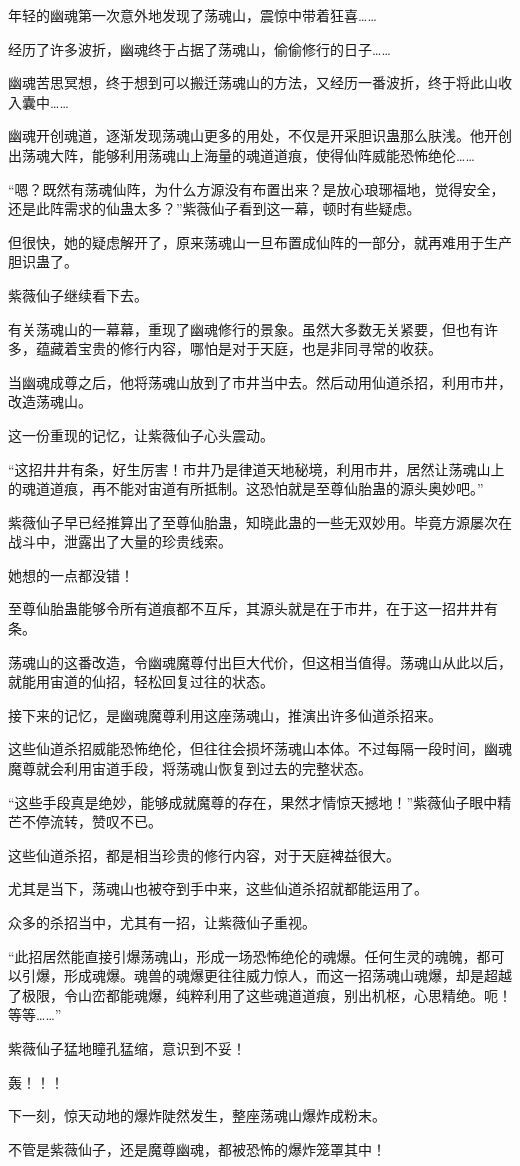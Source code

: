\begin{this_body}
年轻的幽魂第一次意外地发现了荡魂山，震惊中带着狂喜……

经历了许多波折，幽魂终于占据了荡魂山，偷偷修行的日子……

幽魂苦思冥想，终于想到可以搬迁荡魂山的方法，又经历一番波折，终于将此山收入囊中……

幽魂开创魂道，逐渐发现荡魂山更多的用处，不仅是开采胆识蛊那么肤浅。他开创出荡魂大阵，能够利用荡魂山上海量的魂道道痕，使得仙阵威能恐怖绝伦……

“嗯？既然有荡魂仙阵，为什么方源没有布置出来？是放心琅琊福地，觉得安全，还是此阵需求的仙蛊太多？”紫薇仙子看到这一幕，顿时有些疑虑。

但很快，她的疑虑解开了，原来荡魂山一旦布置成仙阵的一部分，就再难用于生产胆识蛊了。

紫薇仙子继续看下去。

有关荡魂山的一幕幕，重现了幽魂修行的景象。虽然大多数无关紧要，但也有许多，蕴藏着宝贵的修行内容，哪怕是对于天庭，也是非同寻常的收获。

当幽魂成尊之后，他将荡魂山放到了市井当中去。然后动用仙道杀招，利用市井，改造荡魂山。

这一份重现的记忆，让紫薇仙子心头震动。

“这招井井有条，好生厉害！市井乃是律道天地秘境，利用市井，居然让荡魂山上的魂道道痕，再不能对宙道有所抵制。这恐怕就是至尊仙胎蛊的源头奥妙吧。”

紫薇仙子早已经推算出了至尊仙胎蛊，知晓此蛊的一些无双妙用。毕竟方源屡次在战斗中，泄露出了大量的珍贵线索。

她想的一点都没错！

至尊仙胎蛊能够令所有道痕都不互斥，其源头就是在于市井，在于这一招井井有条。

荡魂山的这番改造，令幽魂魔尊付出巨大代价，但这相当值得。荡魂山从此以后，就能用宙道的仙招，轻松回复过往的状态。

接下来的记忆，是幽魂魔尊利用这座荡魂山，推演出许多仙道杀招来。

这些仙道杀招威能恐怖绝伦，但往往会损坏荡魂山本体。不过每隔一段时间，幽魂魔尊就会利用宙道手段，将荡魂山恢复到过去的完整状态。

“这些手段真是绝妙，能够成就魔尊的存在，果然才情惊天撼地！”紫薇仙子眼中精芒不停流转，赞叹不已。

这些仙道杀招，都是相当珍贵的修行内容，对于天庭裨益很大。

尤其是当下，荡魂山也被夺到手中来，这些仙道杀招就都能运用了。

众多的杀招当中，尤其有一招，让紫薇仙子重视。

“此招居然能直接引爆荡魂山，形成一场恐怖绝伦的魂爆。任何生灵的魂魄，都可以引爆，形成魂爆。魂兽的魂爆更往往威力惊人，而这一招荡魂山魂爆，却是超越了极限，令山峦都能魂爆，纯粹利用了这些魂道道痕，别出机枢，心思精绝。呃！等等……”

紫薇仙子猛地瞳孔猛缩，意识到不妥！

轰！！！

下一刻，惊天动地的爆炸陡然发生，整座荡魂山爆炸成粉末。

不管是紫薇仙子，还是魔尊幽魂，都被恐怖的爆炸笼罩其中！

\end{this_body}

